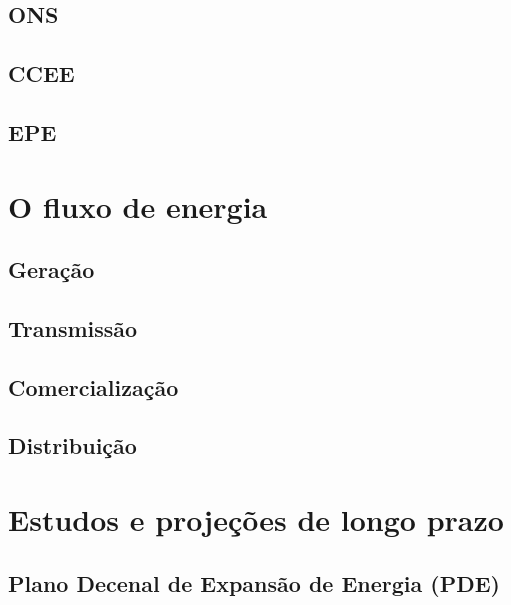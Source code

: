 \documentclass[grad,numbers]{coppe}
\begin{document}
  \hypertarget{ons}{%
  \subsection{ONS}\label{ons}}
  
  \hypertarget{ccee}{%
  \subsection{CCEE}\label{ccee}}
  
  \hypertarget{epe}{%
  \subsection{EPE}\label{epe}}
  
  \hypertarget{o-fluxo-de-energia}{%
  \section{O fluxo de energia}\label{o-fluxo-de-energia}}
  
  \hypertarget{gerauxe7uxe3o}{%
  \subsection{Geração}\label{gerauxe7uxe3o}}
  
  \hypertarget{transmissuxe3o}{%
  \subsection{Transmissão}\label{transmissuxe3o}}
  
  \hypertarget{comercializauxe7uxe3o}{%
  \subsection{Comercialização}\label{comercializauxe7uxe3o}}
  
  \hypertarget{distribuiuxe7uxe3o}{%
  \subsection{Distribuição}\label{distribuiuxe7uxe3o}}
  
  \hypertarget{estudos-e-projeuxe7uxf5es-de-longo-prazo}{%
  \section{Estudos e projeções de longo prazo}\label{estudos-e-projeuxe7uxf5es-de-longo-prazo}}
  
  \hypertarget{plano-decenal-de-expansuxe3o-de-energia-pde}{%
  \subsection{Plano Decenal de Expansão de Energia (PDE)}\label{plano-decenal-de-expansuxe3o-de-energia-pde}}
  
\end{document}
